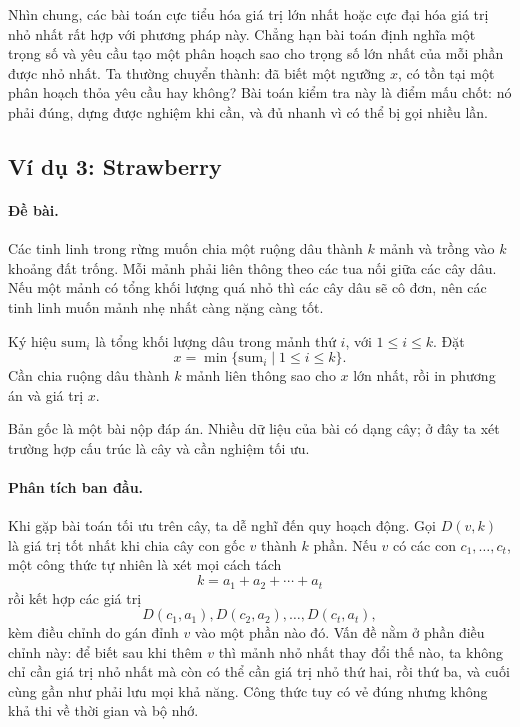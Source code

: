 \documentclass[11pt]{article}
\begin{document}
Nhìn chung, các bài toán cực tiểu hóa giá trị lớn nhất hoặc cực đại hóa giá
trị nhỏ nhất rất hợp với phương pháp này. Chẳng hạn bài toán định nghĩa một
trọng số và yêu cầu tạo một phân hoạch sao cho trọng số lớn nhất của mỗi phần
được nhỏ nhất. Ta thường chuyển thành: đã biết một ngưỡng \(x\), có tồn tại
một phân hoạch thỏa yêu cầu hay không? Bài toán kiểm tra này là điểm mấu chốt:
nó phải đúng, dựng được nghiệm khi cần, và đủ nhanh vì có thể bị gọi nhiều
lần.

\subsection{Ví dụ 3: Strawberry}

\paragraph{Đề bài.}
Các tinh linh trong rừng muốn chia một ruộng dâu thành \(k\) mảnh và trồng
vào \(k\) khoảng đất trống. Mỗi mảnh phải liên thông theo các tua nối giữa
các cây dâu. Nếu một mảnh có tổng khối lượng quá nhỏ thì các cây dâu sẽ cô
đơn, nên các tinh linh muốn mảnh nhẹ nhất càng nặng càng tốt.

Ký hiệu \(\mathrm{sum}_i\) là tổng khối lượng dâu trong mảnh thứ \(i\), với
\(1\le i\le k\). Đặt
\[
  x=\min\{\mathrm{sum}_i\mid 1\le i\le k\}.
\]
Cần chia ruộng dâu thành \(k\) mảnh liên thông sao cho \(x\) lớn nhất, rồi
in phương án và giá trị \(x\).

Bản gốc là một bài nộp đáp án. Nhiều dữ liệu của bài có dạng cây; ở đây ta
xét trường hợp cấu trúc là cây và cần nghiệm tối ưu.

\paragraph{Phân tích ban đầu.}
Khi gặp bài toán tối ưu trên cây, ta dễ nghĩ đến quy hoạch động. Gọi
\(D(v,k)\) là giá trị tốt nhất khi chia cây con gốc \(v\) thành \(k\) phần.
Nếu \(v\) có các con \(c_1,\ldots,c_t\), một công thức tự nhiên là xét mọi
cách tách
\[
  k=a_1+a_2+\cdots+a_t
\]
rồi kết hợp các giá trị
\[
  D(c_1,a_1),D(c_2,a_2),\ldots,D(c_t,a_t),
\]
kèm điều chỉnh do gán đỉnh \(v\) vào một phần nào đó. Vấn đề nằm ở phần điều
chỉnh này: để biết sau khi thêm \(v\) thì mảnh nhỏ nhất thay đổi thế nào, ta
không chỉ cần giá trị nhỏ nhất mà còn có thể cần giá trị nhỏ thứ hai, rồi thứ
ba, và cuối cùng gần như phải lưu mọi khả năng. Công thức tuy có vẻ đúng
nhưng không khả thi về thời gian và bộ nhớ.
\end{document}

